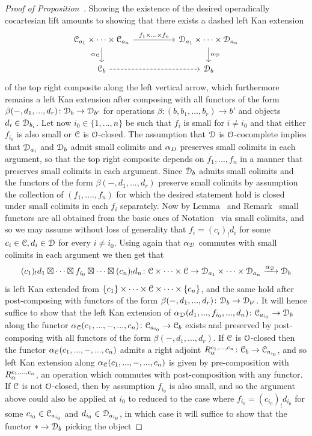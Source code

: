 \begin{proof}[Proof of Proposition~]
Showing the existence of the desired operadically cocartesian lift amounts to showing that there exists a dashed left Kan extension 
\[
\begin{tikzcd}[column sep = 50pt]
\C_{a_1} \times \dots \times \C_{a_n} \ar[r,"f_1 \times ... \times f_n"]\ar[d,"\alp_{\C}"'] & \D_{a_1} \times \dots \times \D_{a_n} \ar[d,"\alp_{\D}"] \\
\C_b \ar[r,dashed] & \D_b
\end{tikzcd}
\]
of the top right composite along the left vertical arrow, which furthermore remains a left Kan extension after composing with all functors of the form $\beta(-,d_1,...,d_r)\colon \mathcal{D}_b \to \mathcal{D}_{b'}$ for operations $\beta\colon (b,b_1,...,b_r) \to b'$ and objects $d_i \in \mathcal{D}_{b_i}$. 
Let now $i_0 \in \{1,...,n\}$ be such that $f_i$ is small for $i \neq i_0$ and that either $f_{i_0}$ is also small or $\mathcal C$ is $\mathcal{O}$-closed. The assumption that $\mathcal{D}$ is $\mathcal{O}$-cocomplete implies that $\mathcal{D}_{a_i}$ and $\mathcal{D}_b$ admit small colimits and $\alpha_D$ %
preserves small colimits in each argument, so that %
the top right composite depends on $f_1,...,f_n$ in a manner that preserves small colimits in each argument. Since $\mathcal{D}_b$ admits small colimits and the functors of the form $\beta(-,d_1,...,d_r)$ preserve small colimits by assumption the collection of $(f_1,....,f_n)$ for which the desired statement hold is closed under small colimits in each $f_i$ separately. Now by Lemma~ and Remark~ small functors are all obtained from the basic ones of Notation~ via small colimits, and so we may assume without loss of generality that $f_{i} = (c_i)_!d_i$ for some $c_i \in \mathcal C,d_i \in \mathcal{D}$ for every $i \neq i_0$.
Using again that $\alpha_{\mathcal{D}}$ commutes with small colimits in each argument we then get that 
\[
(c_1)_!d_1 \boxtimes \dots \boxtimes f_{i_0} \boxtimes \dots \boxtimes (c_n)_!d_n \colon \mathcal C \times \dots \times \mathcal C \to \mathcal{D}_{a_1} \times \dots \times \mathcal{D}_{a_n} \xrightarrow{\alpha_{\mathcal{D}}} \mathcal{D}_b
\]
is left Kan extended from $\{c_1\} \times \dots \times \mathcal C \times \dots \times \{c_n\}$, and the same hold after post-composing with functors of the form $\beta(-,d_1,...,d_r)\colon \mathcal{D}_b \to \mathcal{D}_{b'}$.
It will hence suffice to show that the left Kan extension of $\alpha_{\mathcal{D}}(d_1,...,f_{i_0},...,d_n)\colon \mathcal C_{a_{i_0}} \to \mathcal{D}_b$
along the functor $\alpha_{\mathcal C}(c_1,...,-,...,c_n)\colon \mathcal C_{a_{i_0}} \to \mathcal C_b$
exists and preserved by post-composing with all functors of the form $\beta(-,d_1,...,d_r)$. If $\mathcal C$ is $\mathcal{O}$-closed then the functor $\alpha_{\mathcal C}(c_1,...,-,...,c_n)$ admits a right adjoint $R_{\alpha}^{c_1,...,c_n}\colon \mathcal C_b \to \mathcal C_{a_{i_0}}$, and so left Kan extension along $\alpha_{\mathcal C}(c_1,...,-,...,c_n)$ is given by pre-composition with $R_{\alpha}^{c_1,...,c_n}$, an operation which commutes with post-composition with any functor. If $\mathcal C$ is not $\mathcal{O}$-closed, then by assumption $f_{i_0}$ is also small, and so the argument above could also be applied at $i_0$ to reduced to the case where $f_{i_0} = (c_{i_0})_!d_{i_0}$ for some $c_{i_0} \in \mathcal C_{a_{i_0}}$ and $d_{i_0} \in \mathcal{D}_{a_{i_0}}$, in which case it will suffice to show that the functor $\ast \to \mathcal{D}_b$ picking the object 

\end{proof}
